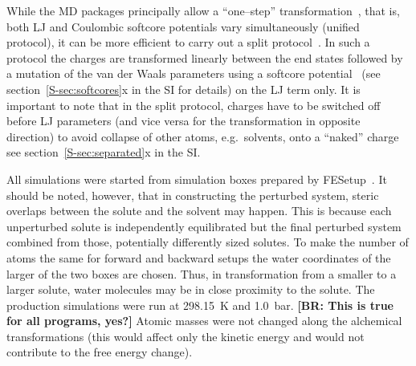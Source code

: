 \documentclass[journal=jctcce,manuscript=article]{achemso}
\begin{document}
While the MD packages principally allow a ``one--step''
transformation~\cite{steinbrecher_soft-core_2011},
that is, both LJ and Coulombic softcore potentials vary
simultaneously (unified protocol), it can be more efficient to carry out a
split protocol~\cite{Deng-2004, naden_linear_2014, naden_linear_2015}.
In such a protocol the charges are transformed
linearly between the end states followed by a mutation of the van der
Waals parameters using a softcore
potential~\cite{beutler_avoiding_1994,
  zacharias_separationshifted_1994} (see section~\ref{S-sec:softcores}x in the
SI for details) on the LJ term only.  It is important to note that in the split protocol, charges have to be switched off before LJ parameters (and vice versa
for the transformation in opposite direction) to avoid collapse of
other atoms, e.g.\ solvents, onto a ``naked''
charge\cite{pitera_comparison_2002, anwar_robust_2005,
steinbrecher_soft-core_2011} see section~\ref{S-sec:separated}x in the SI.

All simulations were started from simulation boxes prepared by
FESetup~\cite{loeffler_fesetup:_2015}.  It should be noted, however, that in
constructing the perturbed system, steric overlaps between the solute and the
solvent may happen.  This is because each unperturbed solute is independently
equilibrated but the final perturbed system combined from those, potentially
differently sized solutes.  To make the number of atoms the same for forward
and backward setups the water coordinates of the larger of the two boxes are
chosen.  Thus, in transformation from a smaller to a larger solute, water
molecules may be in close proximity to the solute.  The production simulations
were run at \SI{298.15}{K} and \SI{1.0}{bar}.
{\color{red} \footnotesize \bf [BR: This is true for all programs, yes?]}
{\color{blue} Atomic masses were not changed along the alchemical transformations (this would affect only the kinetic energy and would not contribute to the free energy change). 
}
\end{document}

